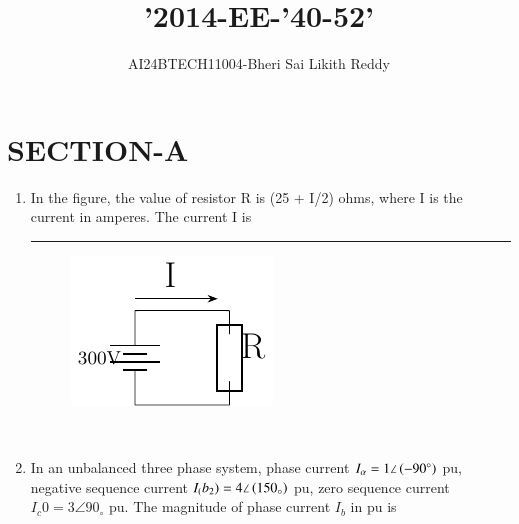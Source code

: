 \documentclass[journal]{IEEEtran}
\begin{document}

\onecolumn
\newpage
\title{ '2014-EE-'40-52'}
\author{AI24BTECH11004-Bheri Sai Likith Reddy}
\maketitle
\section{SECTION-A}

\begin{enumerate}
       \item In the figure, the value of resistor R is (25 + I/2) ohms, where I is the current in amperes. The
       current I is  \rule{1cm}{0.15mm}
		\begin{figure}[h!]
            \centering
            \includegraphics[width=0.2\linewidth]{fig/fig1.pdf}
        \end{figure} \\

	\item In an unbalanced three phase system, phase current $I_\alpha=1\angle \left(-90^{\circ}\right)$ pu, negative sequence current $I_(b_2)=4\angle \left(150_{\circ}\right)$ pu, zero sequence current $I_c0=3 \angle 90_{\circ}$ pu. The magnitude of phase current $I_b$ in pu is


\end{enumerate}
\end{document}
